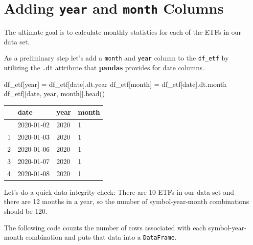 \documentclass[
  letterpaper,
  DIV=11,
  numbers=noendperiod]{scrreprt}
\newenvironment{Shaded}{\begin{snugshade}}{\end{snugshade}}
\newcommand{\NormalTok}[1]{\textcolor[rgb]{0.00,0.23,0.31}{#1}}
\newcommand{\OperatorTok}[1]{\textcolor[rgb]{0.37,0.37,0.37}{#1}}
\newcommand{\StringTok}[1]{\textcolor[rgb]{0.13,0.47,0.30}{#1}}
\begin{document}
\hypertarget{adding-year-and-month-columns}{%
\section{\texorpdfstring{Adding \texttt{year} and \texttt{month}
Columns}{Adding year and month Columns}}\label{adding-year-and-month-columns}}

The ultimate goal is to calculate monthly statistics for each of the
ETFs in our data set.

As a preliminary step let's add a \texttt{month} and \texttt{year}
column to the \texttt{df\_etf} by utilizing the \texttt{.dt} attribute
that \textbf{pandas} provides for date columns.

\begin{Shaded}
\begin{Highlighting}[]
\NormalTok{df\_etf[}\StringTok{\textquotesingle{}year\textquotesingle{}}\NormalTok{] }\OperatorTok{=}\NormalTok{ df\_etf[}\StringTok{\textquotesingle{}date\textquotesingle{}}\NormalTok{].dt.year}
\NormalTok{df\_etf[}\StringTok{\textquotesingle{}month\textquotesingle{}}\NormalTok{] }\OperatorTok{=}\NormalTok{ df\_etf[}\StringTok{\textquotesingle{}date\textquotesingle{}}\NormalTok{].dt.month}
\NormalTok{df\_etf[[}\StringTok{\textquotesingle{}date\textquotesingle{}}\NormalTok{, }\StringTok{\textquotesingle{}year\textquotesingle{}}\NormalTok{, }\StringTok{\textquotesingle{}month\textquotesingle{}}\NormalTok{]].head()}
\end{Highlighting}
\end{Shaded}

\begin{longtable}[]{@{}llll@{}}
\toprule\noalign{}
& date & year & month \\
\midrule\noalign{}
\endhead
\bottomrule\noalign{}
\endlastfoot
0 & 2020-01-02 & 2020 & 1 \\
1 & 2020-01-03 & 2020 & 1 \\
2 & 2020-01-06 & 2020 & 1 \\
3 & 2020-01-07 & 2020 & 1 \\
4 & 2020-01-08 & 2020 & 1 \\
\end{longtable}

Let's do a quick data-integrity check: There are 10 ETFs in our data set
and there are 12 months in a year, so the number of symbol-year-month
combinations should be 120.

The following code counts the number of rows associated with each
symbol-year-month combination and puts that data into a
\texttt{DataFrame}.
\end{document}
